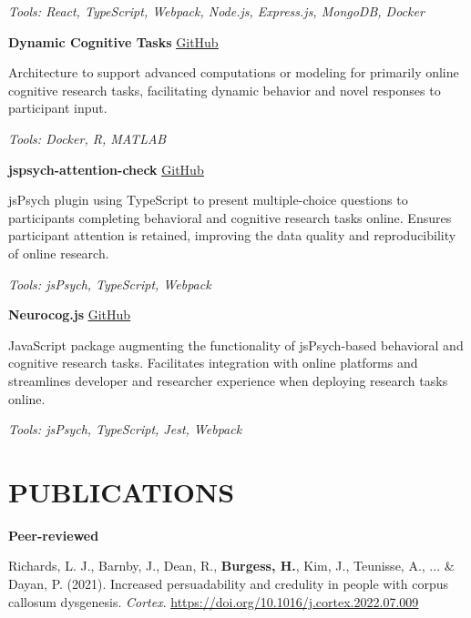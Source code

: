 \documentclass{article}
\begin{document}
  \textit{Tools: React, TypeScript, Webpack, Node.js, Express.js, MongoDB, Docker}

  \medbreak

  \textbf{Dynamic Cognitive Tasks} \hfill \href{https://github.com/Brain-Development-and-Disorders-Lab/task_template_dynamic}{\color{blue}\underline{GitHub}}

  Architecture to support advanced computations or modeling for primarily online cognitive research tasks, facilitating dynamic behavior and novel responses to participant input.

  \textit{Tools: Docker, R, MATLAB}

  \medbreak

  \textbf{jspsych-attention-check} \hfill \href{https://github.com/Brain-Development-and-Disorders-Lab/jspsych-attention-check}{\color{blue}\underline{GitHub}}

  jsPsych plugin using TypeScript to present multiple-choice questions to participants completing behavioral and cognitive research tasks online. Ensures participant attention is retained, improving the data quality and reproducibility of online research.

  \textit{Tools: jsPsych, TypeScript, Webpack}

  \medbreak

  \textbf{Neurocog.js} \hfill \href{https://github.com/Brain-Development-and-Disorders-Lab/Neurocog.js}{\color{blue}\underline{GitHub}}

  JavaScript package augmenting the functionality of jsPsych-based behavioral and cognitive research tasks. Facilitates integration with online platforms and streamlines developer and researcher experience when deploying research tasks online.

  \textit{Tools: jsPsych, TypeScript, Jest, Webpack}

  \section*{\centering\uppercase{Publications}}

  {\large\textbf{Peer-reviewed}}

  Richards, L. J., Barnby, J., Dean, R., \textbf{Burgess, H.}, Kim, J., Teunisse, A., ... \& Dayan, P. (2021). Increased persuadability and credulity in people with corpus callosum dysgenesis. \textit{Cortex}.
  \href{https://doi.org/10.1016/j.cortex.2022.07.009}{\color{blue}\underline{https://doi.org/10.1016/j.cortex.2022.07.009}}
\end{document}
